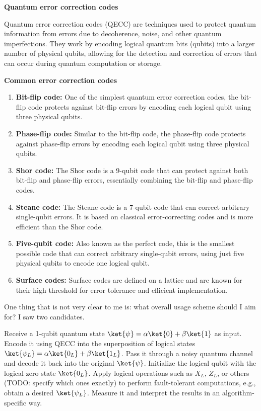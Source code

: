 \vsp
\textbf{Quantum error correction codes}
\vsp

Quantum error correction codes (QECC) are techniques used to protect quantum information from errors
due to decoherence, noise, and other quantum imperfections. They work by encoding logical quantum
bits (qubits) into a larger number of physical qubits, allowing for the detection and correction of
errors that can occur during quantum computation or storage.

\vsp
\textbf{Common error correction codes}
\vsp

\begin{enumerate}
  \item \textbf{Bit-flip code:} One of the simplest quantum error correction codes, the bit-flip
  code protects against bit-flip errors by encoding each logical qubit using three physical qubits.

  \item \textbf{Phase-flip code:} Similar to the bit-flip code, the phase-flip code protects against
  phase-flip errors by encoding each logical qubit using three physical qubits.

  \item \textbf{Shor code:} The Shor code is a 9-qubit code that can protect against both bit-flip
  and phase-flip errors, essentially combining the bit-flip and phase-flip codes.

  \item \textbf{Steane code:} The Steane code is a 7-qubit code that can correct arbitrary
  single-qubit errors. It is based on classical error-correcting codes and is more efficient than
  the Shor code.

  \item \textbf{Five-qubit code:} Also known as the perfect code, this is the smallest possible code
  that can correct arbitrary single-qubit errors, using just five physical qubits to encode one
  logical qubit.

  \item \textbf{Surface codes:} Surface codes are defined on a lattice and are known for their high
  threshold for error tolerance and efficient implementation.
\end{enumerate}


\begin{QUESTION}
One thing that is not very clear to me is: what overall usage scheme should I aim for? I saw two
candidates.

\ls Receive a 1-qubit quantum state $\ket{\psi} = \alpha\ket{0} + \beta\ket{1}$ as input. Encode it
    using QECC into the superposition of logical states $\ket{\psi_L} = \alpha\ket{0_L} +
    \beta\ket{1_L}$. Pass it through a noisy quantum channel and decode it back into the original
    $\ket{\psi}$.
\li Initialize the logical qubit with the logical zero state $\ket{0_L}$. Apply logical operations
    such as $X_L$, $Z_L$, or others (TODO: specify which ones exactly) to perform fault-tolerant
    computations, e.g., obtain a desired $\ket{\psi_L}$. Measure it and interpret the results in an
    algorithm-specific way.
\le
\end{QUESTION}

